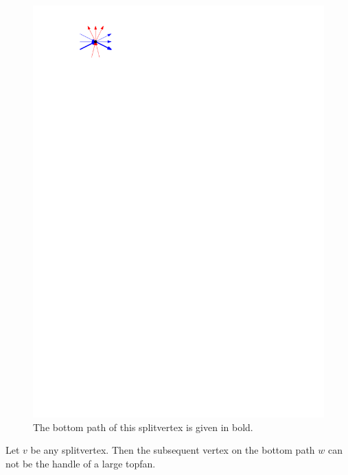   \begin{figure}[h]
    \centering
    \includegraphics[scale=1]{unifiedAlgo/img/sweep/bottompath.pdf}
    \caption{The bottom path of this splitvertex is given in bold.}
    \label{fig:sweep:bottomPath}
  \end{figure}

  \begin{lemma}
    \label{lm:sweep:NoTwoSplitsAboveEachOther}
    Let $v$ be any splitvertex. Then the subsequent vertex on the bottom path $w$ can not be the handle of a large topfan.
  \end{lemma}

